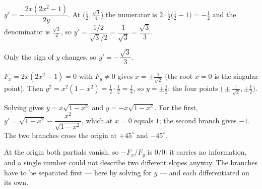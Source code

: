 \begin{solutions}
  \item $y'=-\dfrac{2x(2x^{2}-1)}{2y}$. At
        $\bigl(\tfrac12,\tfrac{\sqrt3}{4}\bigr)$ the numerator is
        $2\cdot\tfrac12\bigl(\tfrac12-1\bigr)=-\tfrac12$ and the denominator
        is $\tfrac{\sqrt3}{2}$, so
        $y'=\dfrac{1/2}{\sqrt3/2}=\dfrac{1}{\sqrt3}=\dfrac{\sqrt3}{3}$.
  \item Only the sign of $y$ changes, so
        $y'=-\dfrac{\sqrt3}{3}$.
  \item $F_{x}=2x(2x^{2}-1)=0$ with $F_{y}\neq0$ gives $x=\pm
        \tfrac{1}{\sqrt2}$ (the root $x=0$ is the singular point). Then
        $y^{2}=x^{2}(1-x^{2})=\tfrac12\cdot\tfrac12=\tfrac14$, so
        $y=\pm\tfrac12$: the four points
        $\bigl(\pm\tfrac{1}{\sqrt2},\pm\tfrac12\bigr)$.
  \item Solving gives $y=x\sqrt{1-x^{2}}$ and $y=-x\sqrt{1-x^{2}}$. For the
        first,
        $y'=\sqrt{1-x^{2}}-\dfrac{x^{2}}{\sqrt{1-x^{2}}}$, which at $x=0$
        equals $1$; the second branch gives $-1$. The two branches cross the
        origin at $+45^{\circ}$ and $-45^{\circ}$.
  \item At the origin both partials vanish, so $-F_{x}/F_{y}$ is $0/0$: it
        carries no information, and a single number could not describe two
        different slopes anyway. The branches have to be separated first ---
        here by solving for $y$ --- and each differentiated on its own.
\end{solutions}
